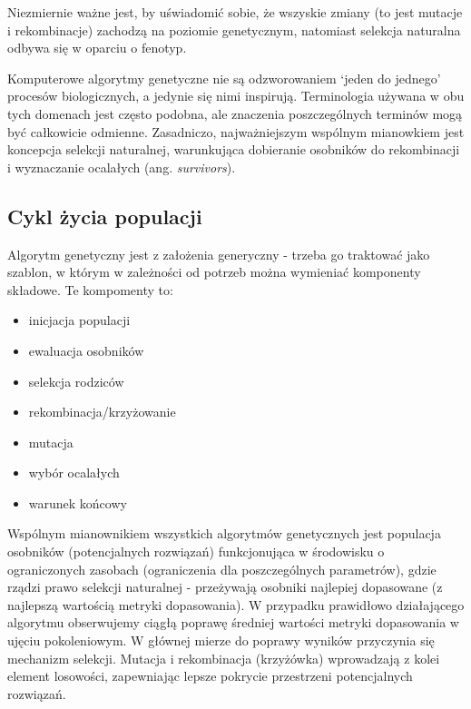 \documentclass[a4paper,11pt]{article}
\begin{document}
    \bigskip

    Niezmiernie ważne jest, by uświadomić sobie, że wszyskie zmiany (to jest mutacje i rekombinacje) zachodzą na poziomie genetycznym, natomiast selekcja naturalna odbywa się w oparciu o fenotyp\cite{IntroductionToEvolutionaryComputing2015}.

    \bigskip

    Komputerowe algorytmy genetyczne nie są odzworowaniem `jeden do jednego' procesów biologicznych, a jedynie się nimi inspirują. Terminologia używana w obu tych domenach jest często podobna, ale znaczenia poszczególnych terminów mogą być całkowicie odmienne. Zasadniczo, najważniejszym wspólnym mianowkiem jest koncepcja selekcji naturalnej, warunkująca dobieranie osobników do rekombinacji i wyznaczanie ocalałych (ang. \textit{survivors}).

    \subsection{Cykl życia populacji}

    Algorytm genetyczny jest z założenia generyczny - trzeba go traktować jako szablon, w którym w zależności od potrzeb można wymieniać komponenty składowe. Te kompomenty to:
    \begin{itemize}
        \item inicjacja populacji
        \item ewaluacja osobników
        \item selekcja rodziców
        \item rekombinacja/krzyżowanie
        \item mutacja
        \item wybór ocalałych
        \item warunek końcowy
    \end{itemize}

    \bigskip

    Wspólnym mianownikiem wszystkich algorytmów genetycznych jest populacja osobników (potencjalnych rozwiązań) funkcjonująca w środowisku o ograniczonych zasobach (ograniczenia dla poszczególnych parametrów), gdzie rządzi prawo selekcji naturalnej - przeżywają osobniki najlepiej dopasowane (z najlepszą wartością metryki dopasowania)\cite{IntroductionToEvolutionaryComputing2015}. W przypadku prawidłowo działającego algorytmu obserwujemy ciągłą poprawę średniej wartości metryki dopasowania w ujęciu pokoleniowym. W głównej mierze do poprawy wyników przyczynia się mechanizm selekcji. Mutacja i rekombinacja (krzyżówka) wprowadzają z kolei element losowości, zapewniając lepsze pokrycie przestrzeni potencjalnych rozwiązań.
\end{document}
